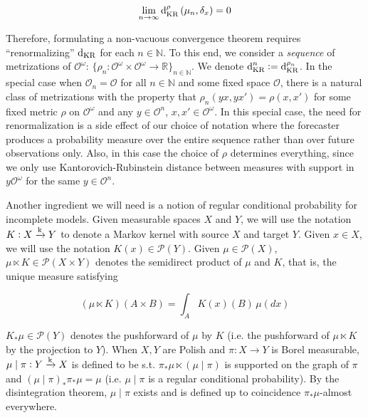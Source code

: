 \documentclass[aop,preprint]{imsart}
\numberwithin{equation}{section}
\theoremstyle{definition}
\theoremstyle{plain}
\newcommand{\Nats}{\mathbb{N}}
\newcommand{\Reals}{\mathbb{R}}
\newcommand{\Sq}[2]{\{#1\}_{#2 \in \Nats}}
\newcommand{\Sqn}[1]{\Sq{#1}{n}}
\newcommand{\M}{\xrightarrow{\textnormal{k}}}
\newcommand{\PM}{\mathcal{P}}
\newcommand{\DKR}{\operatorname{d}_{\textnormal{KR}}}
\newcommand{\Ob}{\mathcal{O}}
\newcommand{\OO}{\Ob^\omega}
\begin{document}
\begin{equation}
\lim_{n \rightarrow \infty} \DKR^\rho\left(\mu_n, \delta_x\right) = 0
\end{equation}

Therefore, formulating a non-vacuous convergence theorem requires \enquote{renormalizing} $\DKR$ for each $n \in \Nats$. To this end, we consider a \emph{sequence} of metrizations of $\OO$: $\Sqn{\rho_n: \OO \times \OO \rightarrow \Reals}$. We denote $\DKR^n:=\DKR^{\rho_n}$. In the special case when $\Ob_n=\Ob$ for all $n \in \Nats$ and some fixed space $\Ob$, there is a natural class of metrizations with the property that $\rho_n(yx,yx')=\rho(x,x')$ for some fixed metric $\rho$ on $\OO$ and any $y \in \Ob^n$, $x,x' \in \OO$. In this special case, the need for renormalization is a side effect of our choice of notation where the forecaster produces a probability measure over the entire sequence rather than over future observations only. Also, in this case the choice of $\rho$ determines everything, since we only use Kantorovich-Rubinstein distance between measures with support in $y\OO$ for the same $y \in \Ob^n$.

Another ingredient we will need is a notion of regular conditional probability for incomplete models. Given measurable spaces $X$ and $Y$, we will use the notation $K: X \M Y$ to denote a Markov kernel with source $X$ and target $Y$. Given $x \in X$, we will use the notation $K\left(x\right) \in \PM\left(Y\right)$. Given $\mu \in \PM\left(X\right)$, $\mu \ltimes K \in \PM\left(X \times Y\right)$ denotes the semidirect product of $\mu$ and $K$, that is, the unique measure satisfying

\begin{equation}
(\mu \ltimes K)(A \times B) = \int_A K(x)(B)\, \mu(dx)
\end{equation} 

$K_* \mu \in \PM\left(Y\right)$ denotes the pushforward of $\mu$ by $K$ (i.e. the pushforward of $\mu \ltimes K$ by the projection to $Y$). When $X,Y$ are Polish and $\pi: X \rightarrow Y$ is Borel measurable, $\mu \mid \pi: Y \M X$ is defined to be s.t. $\pi_* \mu \ltimes \left(\mu \mid \pi\right)$ is supported on the graph of $\pi$ and $\left(\mu \mid \pi\right)_* \pi_* \mu = \mu$ (i.e. $\mu \mid \pi$ is a regular conditional probability). By the disintegration theorem, $\mu \mid \pi$ exists and is defined up to coincidence $\pi_* \mu$-almost everywhere.
\end{document}
